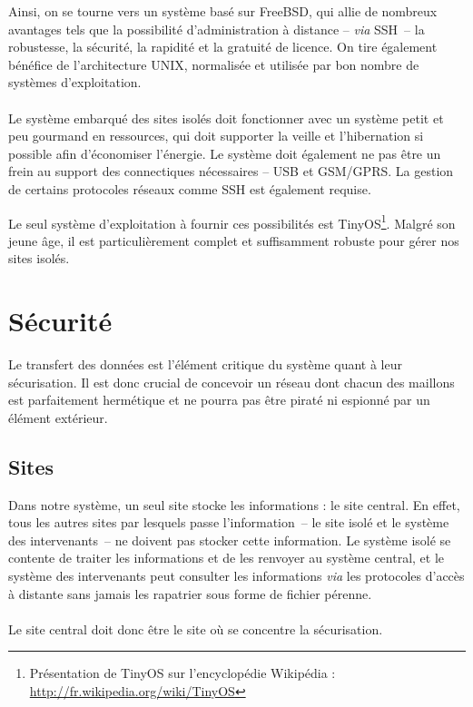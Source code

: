 \documentclass[a4paper, 11pt, final]{article}
\begin{document}
Ainsi, on se tourne vers un système basé sur FreeBSD, qui allie de
nombreux avantages tels que la possibilité d'administration à distance
-- \textit{via} SSH~-- la robustesse, la sécurité, la rapidité et la
gratuité de licence. On tire également bénéfice de l'architecture UNIX,
normalisée et utilisée par bon nombre de systèmes d'exploitation.

\paragraph{}
Le système embarqué des sites isolés doit fonctionner avec un système
petit et peu gourmand en ressources, qui doit supporter la veille et
l'hibernation si possible afin d'économiser l'énergie. Le système doit
également ne pas être un frein au support des connectiques nécessaires
-- USB et GSM/GPRS. La gestion de certains protocoles réseaux comme
SSH est également requise.

Le seul système d'exploitation à fournir ces possibilités est
TinyOS\footnote{Présentation de TinyOS sur l'encyclopédie Wikipédia :
\url{http://fr.wikipedia.org/wiki/TinyOS}}. Malgré son jeune âge, il
est particulièrement complet et suffisamment robuste pour gérer nos
sites isolés.

\section{Sécurité}
Le transfert des données est l'élément critique du système quant à
leur sécurisation. Il est donc crucial de concevoir un réseau dont
chacun des maillons est parfaitement hermétique et ne pourra pas être
piraté ni espionné par un élément extérieur.

\subsection{Sites}
Dans notre système, un seul site stocke les informations : le site
central. En effet, tous les autres sites par lesquels passe
l'information~-- le site isolé et le système des intervenants~-- ne
doivent pas stocker cette information. Le système isolé se contente de
traiter les informations et de les renvoyer au système central, et le
système des intervenants peut consulter les informations \emph{via}
les protocoles d'accès à distante sans jamais les rapatrier sous forme
de fichier pérenne.

\paragraph{}
Le site central doit donc être le site où se concentre la
sécurisation.
\end{document}
